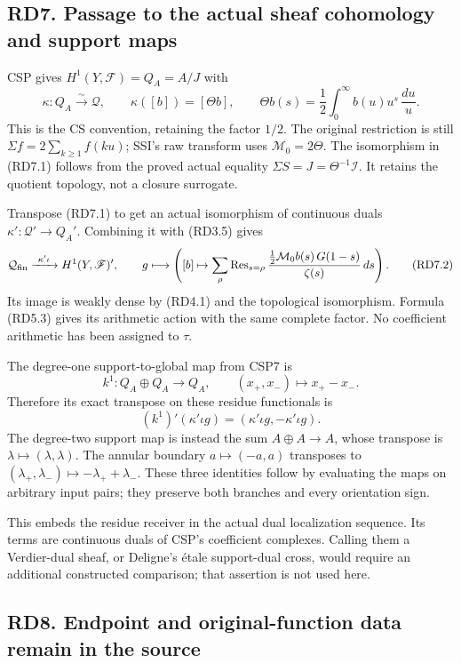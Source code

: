 \subsection{RD7. Passage to the actual sheaf cohomology and support
maps}\label{rd7.-passage-to-the-actual-sheaf-cohomology-and-support-maps}

CSP gives \(H^1(Y,\mathscr F)=Q_A=A/J\) with \[
\kappa:Q_A\xrightarrow{\sim}\mathcal Q,\qquad
\kappa([b])=[\Theta b],\qquad
\Theta b(s)=\frac12\int_0^\infty b(u)u^s\,\frac{du}{u}.
\tag{RD7.1}
\] This is the CS convention, retaining the factor \(1/2\). The original
restriction is still \(\Sigma f=2\sum_{k\ge1}f(ku)\); SSI's raw
transform uses \(\mathcal M_0=2\Theta\). The isomorphism in (RD7.1)
follows from the proved actual equality
\(\Sigma S=J=\Theta^{-1}\mathcal I\). It retains the quotient topology,
not a closure surrogate.

Transpose (RD7.1) to get an actual isomorphism of continuous duals
\(\kappa':\mathcal Q'\to Q_A'\). Combining it with (RD3.5) gives \[
\mathcal Q_{\rm fin}\xrightarrow{\ \kappa'\iota\ }
H^1(Y,\mathscr F)',\qquad
g\longmapsto\left([b]\mapsto
\sum_\rho\operatorname{Res}_{s=\rho}
\frac{\tfrac12\mathcal M_0b(s)\,G(1-s)}{\zeta(s)}\,ds\right).
\tag{RD7.2}
\] Its image is weakly dense by (RD4.1) and the topological isomorphism.
Formula (RD5.3) gives its arithmetic action with the same complete
factor. No coefficient arithmetic has been assigned to \(\tau\).

The degree-one support-to-global map from CSP7 is \[
k^1:Q_A\oplus Q_A\longrightarrow Q_A,\qquad
(x_+,x_-)\longmapsto x_+-x_-.
\tag{RD7.3}
\] Therefore its exact transpose on these residue functionals is \[
(k^1)'(\kappa'\iota g)
=(\kappa'\iota g,-\kappa'\iota g).
\tag{RD7.4}
\] The degree-two support map is instead the sum \(A\oplus A\to A\),
whose transpose is \(\lambda\mapsto(\lambda,\lambda)\). The annular
boundary \(a\mapsto(-a,a)\) transposes to
\((\lambda_+,\lambda_-)\mapsto-\lambda_++\lambda_-\). These three
identities follow by evaluating the maps on arbitrary input pairs; they
preserve both branches and every orientation sign.

This embeds the residue receiver in the actual dual localization
sequence. Its terms are continuous duals of CSP's coefficient complexes.
Calling them a Verdier-dual sheaf, or Deligne's étale support-dual
cross, would require an additional constructed comparison; that
assertion is not used here.

\subsection{RD8. Endpoint and original-function data remain in the
source}\label{rd8.-endpoint-and-original-function-data-remain-in-the-source}


